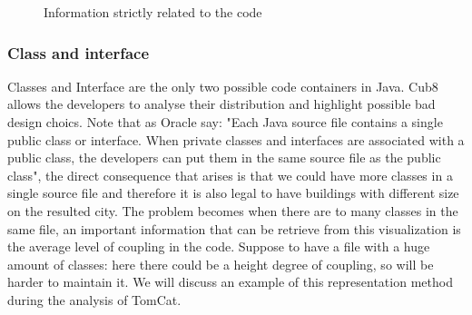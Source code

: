 \documentclass[]{usiinfbachelorproject}
\begin{document}
\begin{figure}[h]
\centering
{}
\hspace*{\fill}

\caption{Information strictly related to the code}
\label{fig:strictly}
\end{figure}
\newpage

\subsubsection{Class and interface}

Classes and Interface are the only two possible code containers in Java. Cub8 allows the developers to analyse their distribution and highlight possible bad design choics.
Note that as Oracle \cite{oracle} say: "Each Java source file contains a single public class or interface. When private classes and interfaces are associated with a public class, the developers can put them in the same source file as the public class", the direct consequence that arises is that we could have more classes in a single source file and therefore it is also legal to have buildings with different size on the resulted city.
The problem becomes when there are to many classes in the same file, an important information that can be retrieve from this visualization is the average level of coupling in the code. Suppose to have a file with a huge amount of classes: here there could be a  height degree of coupling, so will be harder to maintain it. We will discuss an example of this representation method during the analysis of TomCat.
\end{document}
